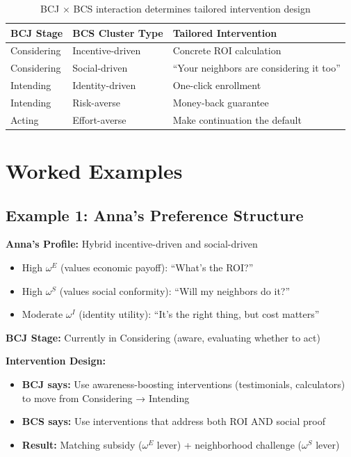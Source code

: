 \begin{table}[h]
\centering
\small
\begin{tabular}{lll}
\toprule
\textbf{BCJ Stage} & \textbf{BCS Cluster Type} & \textbf{Tailored Intervention} \\
\midrule
Considering & Incentive-driven & Concrete ROI calculation \\
Considering & Social-driven & ``Your neighbors are considering it too'' \\
Intending & Identity-driven & One-click enrollment \\
Intending & Risk-averse & Money-back guarantee \\
Acting & Effort-averse & Make continuation the default \\
\bottomrule
\end{tabular}
\caption{BCJ × BCS interaction determines tailored intervention design}
\label{tab:bcj-bcs-interaction}
\end{table}

\section{Worked Examples}
\label{sec:worked-examples}

\subsection{Example 1: Anna's Preference Structure}

\textbf{Anna's Profile:} Hybrid incentive-driven and social-driven

\begin{itemize}
    \item High $\omega^E$ (values economic payoff): ``What's the ROI?''
    \item High $\omega^S$ (values social conformity): ``Will my neighbors do it?''
    \item Moderate $\omega^I$ (identity utility): ``It's the right thing, but cost matters''
\end{itemize}

\textbf{BCJ Stage:} Currently in Considering (aware, evaluating whether to act)

\textbf{Intervention Design:}
\begin{itemize}
    \item \textbf{BCJ says:} Use awareness-boosting interventions (testimonials, calculators)
    to move from Considering → Intending
    \item \textbf{BCS says:} Use interventions that address both ROI AND social proof
    \item \textbf{Result:} Matching subsidy ($\omega^E$ lever) + neighborhood challenge
    ($\omega^S$ lever)
\end{itemize}

